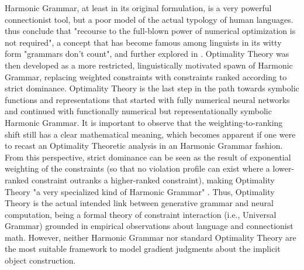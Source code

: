 Harmonic Grammar, at least in its original formulation, is a very powerful connectionist tool, but a poor model of the actual typology of human languages. \textcite[216]{princesmolensky1993optimality} thus conclude that "recourse to the full-blown power of numerical optimization is not required", a concept that has become famous among linguists in its witty form "grammars don't count", and further explored in \textcite{smolensky2006harmony}. Optimality Theory was then developed as a more restricted, linguistically motivated spawn of Harmonic Grammar, replacing weighted constraints with constraints ranked according to strict dominance. Optimality Theory is the last step in the path towards symbolic functions and representations that started with fully numerical neural networks and continued with functionally numerical but representationally symbolic Harmonic Grammar. It is important to observe that the weighting-to-ranking shift still has a clear mathematical meaning, which becomes apparent if one were to recast an Optimality Theoretic analysis in an Harmonic Grammar fashion. From this perspective, strict dominance can be seen as the result of exponential weighting of the constraints (so that no violation profile can exist where a lower-ranked constraint outranks a higher-ranked constraint), making Optimality Theory "a very specialized kind of Harmonic Grammar" \parencite{princesmolensky1993optimality, PrinceSmolensky2008}. Thus, Optimality Theory is the actual intended link between generative grammar and neural computation, being a formal theory of constraint interaction (i.e., Universal Grammar) grounded in empirical observations about language and connectionist math. However, neither Harmonic Grammar nor standard Optimality Theory are the most suitable framework to model gradient judgments about the implicit object construction.


